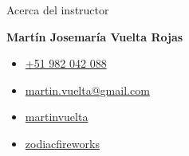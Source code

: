 \begin{frame}[fragile]{Acerca del instructor}
  \begin{center}
    \textbf{Martín Josemaría Vuelta Rojas}
  \end{center}

  \begin{itemize}[<+(1)->]
    \item[\faMobile]   \begin{center}
      \href{tel:+51982042088}{+51 982 042 088}
    \end{center}
    \item[\faEnvelope] \begin{center}
      \href{mailto:martin.vuelta@gmail.com}{martin.vuelta@gmail.com}
    \end{center}
    \item[\faLinkedin] \begin{center}
      \href{https://www.linkedin.com/in/martinvuelta/}{martinvuelta}
    \end{center}
    \item[\faGithub]   \begin{center}
      \href{https://github.com/zodiacfireworks}{zodiacfireworks}
    \end{center}
  \end{itemize}
\end{frame}
